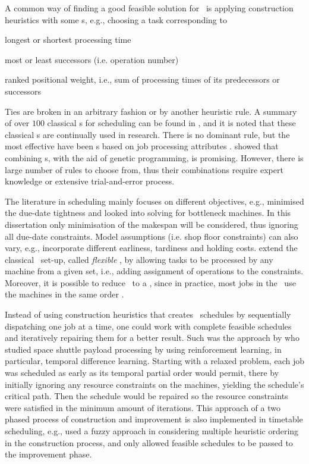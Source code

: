 A common way of finding a good feasible solution for \JSP\ is 
applying construction heuristics with some \dr s, e.g., choosing a task 
corresponding to
\begin{enumerate*}[itemjoin*={{, or }}]
  \item longest or shortest processing time
  \item most or least successors (i.e. operation number)
  \item ranked positional weight, i.e., sum of processing times of its 
  predecessors or successors
\end{enumerate*} 
Ties are broken in an arbitrary fashion or by another heuristic rule.
A summary of over $100$ classical \dr s for scheduling can be found in 
\citet{Panwalkar77}, and it is noted that these classical \dr s are continually 
used in research.  
There is no dominant rule, but the most effective have been \sdr s based on job 
processing attributes \citep{Haupt89}. \citet{Tay08} showed that combining \dr 
s, with the aid of genetic programming, is promising. However, there is large 
number of rules to choose from, thus their combinations require expert 
knowledge or extensive trial-and-error process.

The literature in scheduling mainly focuses on different objectives, 
e.g., \citet{Chang96} minimised the due-date tightness and 
\citet{Drobouchevitch2000,Gao2007} looked into solving for bottleneck machines. 
In this dissertation only minimisation of the makespan will be considered, thus 
ignoring all due-date constraints. 
Model assumptions (i.e. shop floor constraints) can also vary, e.g., 
\citet{Thiagarajan05} incorporate different earliness, tardiness and holding 
costs. 
\citet{Brandimarte1993,Xia2005,Pezzella2008} extend the classical \JSP\ set-up, 
called \emph{flexible} \jsp, by allowing tasks to be processed by any machine 
from a given set, i.e., adding assignment of operations to the constraints.
Moreover, it is possible to reduce \JSP\ to a \FSP, since in practice, 
most jobs in the \jsp\ use the machines in the same order 
\citep{Guinet1998,Ho2007}.

Instead of using construction heuristics that creates \jsp\ schedules by sequentially dispatching one job at a time, one could work with complete feasible schedules and iteratively repairing them for a better result. Such was the approach by \cite{Zhang95} who studied space shuttle payload processing by using reinforcement learning, in particular, temporal difference learning. Starting with a relaxed problem, each job was scheduled as early as its temporal partial order would permit, there by initially ignoring any resource constraints on the machines, yielding the schedule's critical path. Then the schedule would be repaired so the resource constraints were satisfied in the minimum amount of iterations.
This approach of a two phased process of construction and improvement is also implemented in timetable scheduling, e.g., \citet{Asmuni09} used a fuzzy approach in considering multiple heuristic ordering in the construction process, and only allowed feasible schedules to be passed to the improvement phase. 

